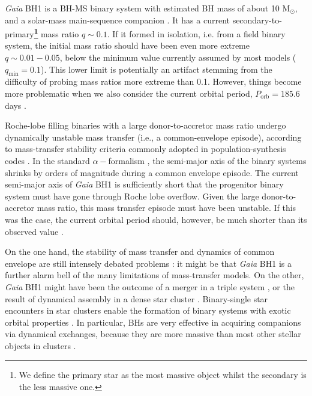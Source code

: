 \documentclass[fleqn,usenatbib]{mnras}
\newcommand{\bh}{\textit{Gaia} BH1}
\newcommand{\SR}[1]{\textcolor{red}{#1}}
\begin{document}
\bh{} is a BH-MS binary system with estimated BH mass of about 10 M$_\odot$, and a solar-mass main-sequence companion \citep{elbadry2023a}. It has a current secondary-to-primary\textbf{\footnote{We define the primary star as the most massive object whilst the secondary is the less massive one.}} mass ratio $q\sim{0.1}$. If it formed in isolation, i.e. from a field binary system, the initial mass ratio should have been even more extreme $q\sim{0.01-0.05}$, below the minimum value currently assumed by most models ($q_\mathrm{min}=0.1$). 
This lower limit is potentially an artifact stemming from the difficulty of probing mass ratios more extreme than 0.1. However, things become more problematic when we also consider the current orbital period, $P_\mathrm{orb}=185.6$ days \citep{elbadry2023a}. 



Roche-lobe filling binaries with a large donor-to-accretor mass ratio undergo dynamically unstable mass transfer (i.e., a common-envelope episode), according to mass-transfer stability criteria commonly adopted in population-synthesis codes \citep{hurley02}. In the standard $\alpha-$formalism \citep{webbink84}, the semi-major axis of the binary systems shrinks by orders of magnitude during a common envelope episode. The current semi-major axis of \bh{} is sufficiently short that the progenitor binary system must have gone through Roche lobe overflow. Given the large donor-to-accretor mass ratio, this mass transfer episode must have been unstable. If this was the case, the current orbital period should, however, be much shorter than its observed value \citep{breivik2017,elbadry2023a}.%


On the one hand, the stability of mass transfer and dynamics of common envelope 
are still intensely debated problems  \citep{Ivanova2013,marchant2021,gallego-garcia2021,roepke2022}: it might be that \bh{} is a further alarm bell of the many limitations of mass-transfer models. On the other, \bh{} might have been the outcome of a merger in a triple system \citep{elbadry2023a}, or the result of dynamical assembly in a dense star cluster  \citep[e.g.,][]{shikauchi2020,tanikawa2023}. 
Binary-single star encounters in star clusters enable the formation of binary systems with exotic orbital properties \citep{heggie75,Portegies-Zwart10}. In particular, BHs are very effective in acquiring companions via dynamical exchanges, because they are more massive than most other stellar objects in clusters \citep{hills1980,mapelli16,dicarlo2019,Rastello2018,Trani2022}. 
\end{document}
